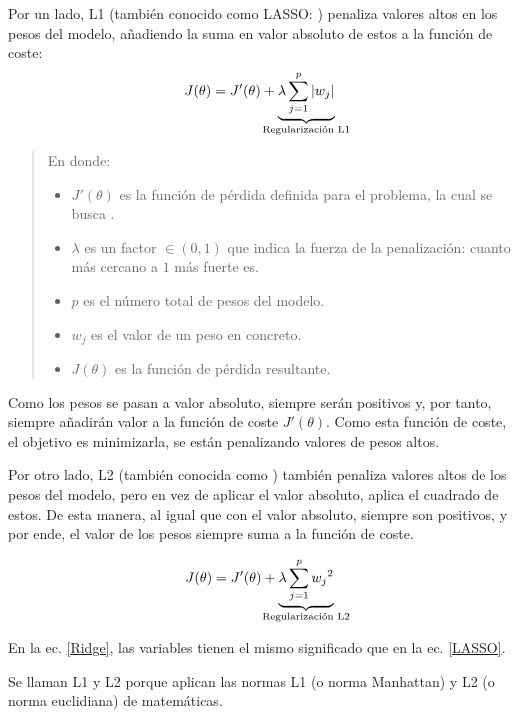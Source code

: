 Por un lado, L1 (también conocido como LASSO: ) penaliza valores altos en los pesos del modelo, añadiendo la suma en valor absoluto de estos a la función de coste:
\begin{equation}
    \label{LASSO}
    J(\theta) = J'(\theta) + \underbrace{\textstyle{\lambda \Sum{j=1}{p}|w_j|}}_{\mathclap{\text{Regularización L1}}}
\end{equation}

\begin{quote}
    En donde:
    \begin{itemize}
        \item $J'(\theta)$ es la función de pérdida definida para el problema, la cual se busca .
        \item $\lambda$ es un factor $\in (0,1)$ que indica la fuerza de la penalización: cuanto más cercano a $1$ más fuerte es.
        \item $p$  es el número total de pesos del modelo.
        \item $w_j$ es el valor de un peso en concreto.
        \item $J(\theta)$ es la función de pérdida resultante.
    \end{itemize}
\end{quote}

Como los pesos se pasan a valor absoluto, siempre serán positivos y, por tanto, siempre añadirán valor a la función de coste $J'(\theta)$. Como esta función de coste, el objetivo es minimizarla, se están penalizando valores de pesos altos. 

Por otro lado, L2 (también conocida como ) también penaliza valores altos de los pesos del modelo, pero en vez de aplicar el valor absoluto, aplica el cuadrado de estos. De  esta manera, al igual que con el valor absoluto, siempre son positivos, y por ende, el valor de los pesos siempre suma a la función de coste.

\begin{equation}
    \label{Ridge}
    J(\theta) = J'(\theta) + \underbrace{\textstyle{\lambda \Sum{j=1}{p} {w_j}^2}}_{\mathclap{\text{Regularización L2}}}
\end{equation}

En la ec. \ref{Ridge}, las variables tienen el mismo significado que en la ec. \ref{LASSO}.

Se llaman L1 y L2 porque aplican las normas L1 (o norma Manhattan) y L2 (o norma euclidiana) de matemáticas\fnm.

